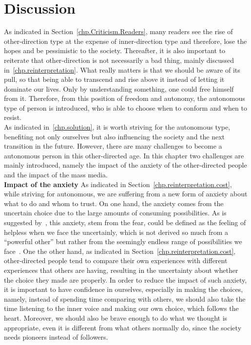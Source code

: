 \chapter{Discussion}\label{chp.discussion}

As indicated in Section~\ref{chp.Criticism.Readers}, many readers see the rise of other-direction type at the expense of inner-direction type and therefore, lose the hopes and be pessimistic to the society. Thereafter, it is also important to reiterate that other-direction is not necessarily a bad thing, mainly discussed in~\ref{chp.reinterpretation}. What really matters is that we should be aware of its pull, so that being able to transcend and rise above it instead of letting it dominate our lives. Only by understanding something, one could free himself from it. Therefore, from this position of freedom and autonomy, the autonomous type of person is introduced, who is able to choose when to conform and when to resist.\\

As indicated in~\ref{chp.solution}, it is worth striving for the autonomous type, benefiting not only ourselves but also influencing the society and the next transition in the future. However, there are many challenges to become a autonomous person in this other-directed age. In this chapter two challenges are mainly introduced, namely the impact of the anxiety of the other-directed people and the impact of the mass media.\\

\textbf{Impact of the anxiety}
As indicated in Section~\ref{chp.reinterpretation.cost}, while striving for autonomous, we are suffering from a new form of anxiety about what to do and whom to trust. On one hand, the anxiety comes from the uncertain choice due to the large amounts of consuming possibilities. As is suggested by~\citeauthor{bude2014gesellschaft}, this anxiety, stem from the fear, could be defined as the feeling of helpless when we face the uncertainly, which is not derived so much from a ``powerful other'' but rather from the seemingly endless range of possibilities we face~\citep{bude2014gesellschaft}. One the other hand, as indicated in Section~\ref{chp.reinterpretation.cost}, other-directed people tend to compare their own experiences with different experiences that others are having, resulting in the uncertainty about whether the choice they made are properly. In order to reduce the impact of such anxiety, it is important to have confidence in ourselves, especially in making the choices, namely, instead of spending time comparing with others, we should also take the time listening to the inner voice and making our own choice, which follows the heart. Moreover, we should also be brave enough to do what we thought is appropriate, even it is different from what others normally do, since the society needs pioneers instead of followers.


